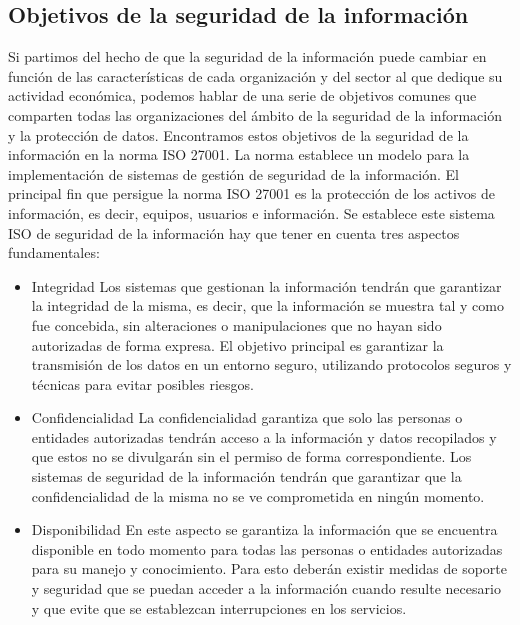 \documentclass[12pt]{article}
\begin{document}
\subsection*{Objetivos de la seguridad de la información}
Si partimos del hecho de que la seguridad de la información puede cambiar en función de las características de cada organización y del sector al que dedique su actividad económica, podemos hablar de una serie de objetivos comunes que comparten todas las organizaciones del ámbito de la seguridad de la información y la protección de datos.
Encontramos estos objetivos de la seguridad de la información en la norma ISO 27001. La norma establece un modelo para la implementación de sistemas de gestión de seguridad de la información. El principal fin que persigue la norma ISO 27001 es la protección de los activos de información, es decir, equipos, usuarios e información.
Se establece este sistema ISO de seguridad de la información hay que tener en cuenta tres aspectos fundamentales:

\begin{itemize}
    \item Integridad
Los sistemas que gestionan la información tendrán que garantizar la integridad de la misma, es decir, que la información se muestra tal y como fue concebida, sin alteraciones o manipulaciones que no hayan sido autorizadas de forma expresa.
El objetivo principal es garantizar la transmisión de los datos en un entorno seguro, utilizando protocolos seguros y técnicas para evitar posibles riesgos.

\item Confidencialidad
La confidencialidad garantiza que solo las personas o entidades autorizadas tendrán acceso a la información y datos recopilados y que estos no se divulgarán sin el permiso de forma correspondiente. Los sistemas de seguridad de la información tendrán que garantizar que la confidencialidad de la misma no se ve comprometida en ningún momento.

\item Disponibilidad
En este aspecto se garantiza la información que se encuentra disponible en todo momento para todas las personas o entidades autorizadas para su manejo y conocimiento. Para esto deberán existir medidas de soporte y seguridad que se puedan acceder a la información cuando resulte necesario y que evite que se establezcan interrupciones en los servicios.

\end{itemize}
\end{document}
